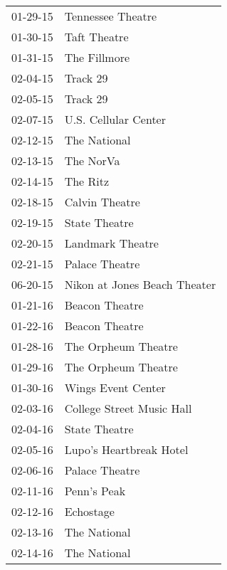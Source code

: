 \begin{supertabular}{p{0.07\textwidth}p{0.23\textwidth}}
 01-29-15 &                     Tennessee Theatre \\
 01-30-15 &                          Taft Theatre \\
 01-31-15 &                          The Fillmore \\
 02-04-15 &                              Track 29 \\
 02-05-15 &                              Track 29 \\
 02-07-15 &                  U.S. Cellular Center \\
 02-12-15 &                          The National \\
 02-13-15 &                             The NorVa \\
 02-14-15 &                              The Ritz \\
 02-18-15 &                        Calvin Theatre \\
 02-19-15 &                         State Theatre \\
 02-20-15 &                      Landmark Theatre \\
 02-21-15 &                        Palace Theatre \\
 06-20-15 &          Nikon at Jones Beach Theater \\
 01-21-16 &                        Beacon Theatre \\
 01-22-16 &                        Beacon Theatre \\
 01-28-16 &                   The Orpheum Theatre \\
 01-29-16 &                   The Orpheum Theatre \\
 01-30-16 &                    Wings Event Center \\
 02-03-16 &             College Street Music Hall \\
 02-04-16 &                         State Theatre \\
 02-05-16 &               Lupo's Heartbreak Hotel \\
 02-06-16 &                        Palace Theatre \\
 02-11-16 &                           Penn's Peak \\
 02-12-16 &                             Echostage \\
 02-13-16 &                          The National \\
 02-14-16 &                          The National \\

\end{supertabular}
